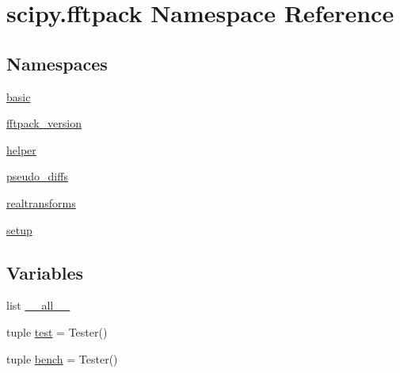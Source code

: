 \hypertarget{namespacescipy_1_1fftpack}{}\section{scipy.\+fftpack Namespace Reference}
\label{namespacescipy_1_1fftpack}
\subsection*{Namespaces}
\begin{DoxyCompactItemize}
\item 
 \hyperlink{namespacescipy_1_1fftpack_1_1basic}{basic}
\item 
 \hyperlink{namespacescipy_1_1fftpack_1_1fftpack__version}{fftpack\+\_\+version}
\item 
 \hyperlink{namespacescipy_1_1fftpack_1_1helper}{helper}
\item 
 \hyperlink{namespacescipy_1_1fftpack_1_1pseudo__diffs}{pseudo\+\_\+diffs}
\item 
 \hyperlink{namespacescipy_1_1fftpack_1_1realtransforms}{realtransforms}
\item 
 \hyperlink{namespacescipy_1_1fftpack_1_1setup}{setup}
\end{DoxyCompactItemize}
\subsection*{Variables}
\begin{DoxyCompactItemize}
\item 
list \hyperlink{namespacescipy_1_1fftpack_a7ca2dcf4bb2b229a4da1f2633bde070e}{\+\_\+\+\_\+all\+\_\+\+\_\+}
\item 
tuple \hyperlink{namespacescipy_1_1fftpack_a28c62e1d92ccd84a78bafefbc4cb67a5}{test} = Tester()
\item 
tuple \hyperlink{namespacescipy_1_1fftpack_a18a86b13f1ebf6ffe7157c7843ce3ad4}{bench} = Tester()
\end{DoxyCompactItemize}


